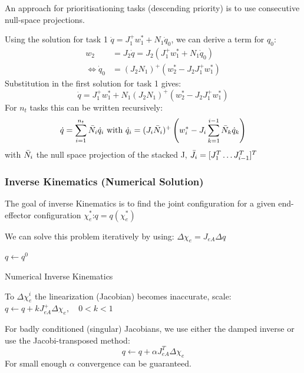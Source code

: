 \documentclass[fontsize=6pt,DIV=calc,a4paper,ngerman]{scrartcl}
\begin{document}
\begin{multicols*}{4}
	An approach for prioritisationing tasks (descending priority) is to use consecutive null-space projections.

	\smallskip
	Using the solution for task 1 $\dot{q} = J_1^+w_1^*+N_1\dot{q}_0$, we can derive a term for $q_0$:
	\begin{align*}
		w_2                           & =J_2\dot{q}= J_2(J_1^+w_1^*+N_1\dot{q}_0) \\
		\Longleftrightarrow \dot{q}_0 & = (J_2N_1)^+(w_2^*-J_2J_1^+w_1^*)
	\end{align*}
	Substitution in the first solution for task 1 gives:
	$$\dot{q} = J_1^+w_1^*+N_1(J_2N_1)^+(w_2^*-J_2J_1^+w_1^*)$$
	For $n_t$ tasks this can be written recursively:
	$$\dot{q}= \sum_{i=1}^{n_t}\Bar{N}_i\dot{q}_i \text{ with } \dot{q}_i = (J_i\Bar{N}_i)^+\left( w_i^* - J_i \sum_{k=1}^{i-1}\Bar{N}_k\dot{q}_k\right)$$
	with $\Bar{N}_i$ the null space projection of the stacked J, $\Bar{J}_i = [J_1^T \dots J_{i-1}^T ]^T$

	\subsubsection{Inverse Kinematics (Numerical Solution)}
	The goal of inverse Kinematics is to find the joint configuration for a given end-effector configuration $\chi_e^*$:\quad $q=q(\chi_e^*)$

	\smallskip
	We can solve this problem iteratively by using: $\Delta\chi_e = J_{eA}\Delta q$
	\begin{algorithm}[H]
		\small
		\SetAlgoLined
		$q \leftarrow q^0$ 
		\caption{Numerical Inverse Kinematics}
	\end{algorithm}

	To $\Delta\chi_e^i$ the linearization (Jacobian) becomes inaccurate, scale:
	$q \leftarrow q + kJ_{eA}^+ \Delta\chi_e ,\quad 0<k<1$

	\smallskip
	For badly conditioned (singular) Jacobians, we use either the damped inverse or use the Jacobi-transposed method:
	$$q \leftarrow q + \alpha J_{eA}^T \Delta\chi_e$$
	For small enough $\alpha$ convergence can be guaranteed.


\end{multicols*}
\end{document}
